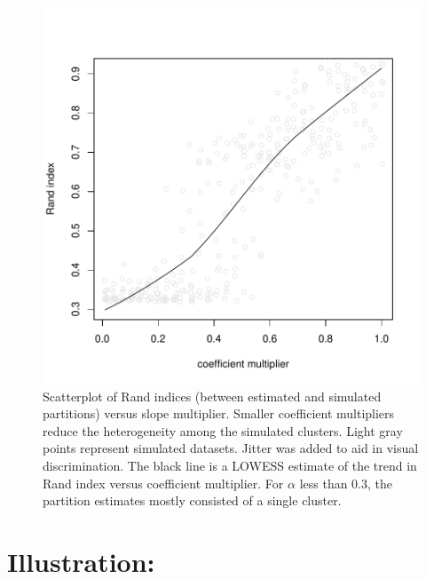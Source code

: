 \documentclass[article, nojss]{jss}
\begin{document}
\begin{figure}[h!]
\begin{center}
\includegraphics{profdpm-007}
\end{center}
\caption{Scatterplot of Rand indices (between estimated and simulated partitions) versus slope multiplier. Smaller coefficient multipliers reduce the heterogeneity among the simulated clusters. Light gray points represent simulated datasets. Jitter was added to aid in visual discrimination. The black line is a LOWESS estimate of the trend in Rand index versus coefficient multiplier. For $\alpha$ less than 0.3, the partition estimates mostly consisted of a single cluster. \label{fig:sim2}}
\end{figure}

\vspace{1cm}
\section[Illustrations]{Illustration: } \label{Examples:profBinary}
\end{document}
